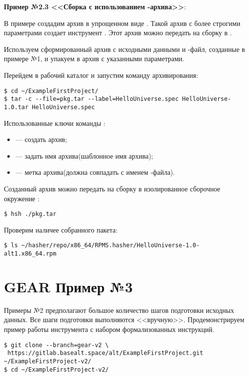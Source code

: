 \textbf{Пример №2.3 <<Сборка с использованием -архива>>}:

В примере создадим архив  в упрощенном виде . Такой архив с более строгими
параметрами создает инструмент . Этот архив можно передать на сборку в
.

Используем сформированный архив с исходными данными и -файл, созданные
в примере №1, и  упакуем в архив с указанными параметрами.

Перейдем в рабочий каталог и запустим команду архивирования:
\begin{verbatim}
$ cd ~/ExampleFirstProject/
$ tar -c --file=pkg.tar --label=HelloUniverse.spec HelloUniverse-1.0.tar HelloUniverse.spec
\end{verbatim}
Использованные ключи команды :
\begin{itemize}
	\item {} --- создать архив;
	\item {} --- задать имя архива(шаблонное имя архива);
	\item {} --- метка архива(должна совпадать с именем -файла).
\end{itemize}

Созданный архив можно передать на сборку в изолированное сборочное
окружение :
\begin{verbatim}
$ hsh ./pkg.tar
\end{verbatim}

Проверим наличее собранного пакета:
\begin{verbatim}
$ ls ~/hasher/repo/x86_64/RPMS.hasher/HelloUniverse-1.0-alt1.x86_64.rpm
\end{verbatim}

\section{GEAR \textbf{Пример №3}}

Примеры №2 предполагают большое количество шагов подготовки исходных данных.
Все шаги подготовки выполняются <<вручную>>. Продемонстрируем пример работы
инструмента  с набором формализованных инструкций.

\begin{verbatim}
$ git clone --branch=gear-v2 \
 https://gitlab.basealt.space/alt/ExampleFirstProject.git ~/ExampleFirstProject-v2/
$ cd ~/ExampleFirstProject-v2/
\end{verbatim}

